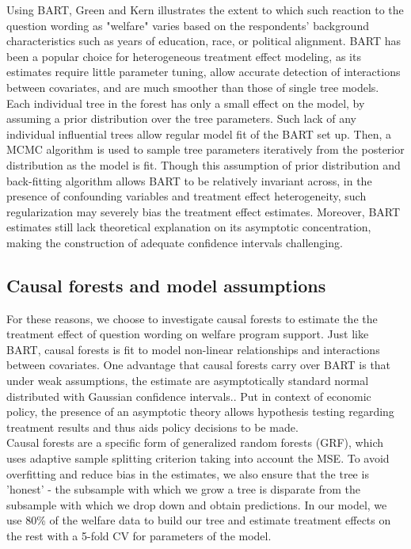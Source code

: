 \documentclass[12pt]{article}
\begin{document}
Using BART, Green and Kern illustrates the extent to which such reaction to the question wording as "welfare" varies based on the respondents' background characteristics such as years of education, race, or political alignment. BART has been a popular choice for heterogeneous treatment effect modeling, as its estimates require little parameter tuning, allow accurate detection of interactions between covariates, and are much smoother than those of single tree models. Each individual tree in the forest has only a small effect on the model, by assuming a prior distribution over the tree parameters.\cite{Chipman2010} Such lack of any individual influential trees allow regular model fit of the BART set up. Then, a MCMC algorithm is used to sample tree parameters iteratively from the posterior distribution as the model is fit. Though this assumption of prior distribution and back-fitting algorithm allows BART to be relatively invariant across, in the presence of confounding variables and treatment effect heterogeneity, such regularization may severely bias the treatment effect estimates.\cite{CarvalhoHahnMurray} Moreover, BART estimates still lack theoretical explanation on its asymptotic concentration, making the construction of adequate confidence intervals challenging. 

\subsection{Causal forests and model assumptions} 
For these reasons, we choose to investigate causal forests to estimate the the treatment effect of question wording on welfare program support. Just like BART, causal forests is fit to model non-linear relationships and interactions between covariates. One advantage that causal forests carry over BART is that under weak assumptions, the estimate are asymptotically standard normal distributed with Gaussian confidence intervals.\cite{atheywager2019}. Put in context of economic policy, the presence of an asymptotic theory allows hypothesis testing regarding treatment results and thus aids policy decisions to be made. \\

Causal forests are a specific form of generalized random forests (GRF), which uses adaptive sample splitting criterion taking into account the MSE. To avoid overfitting and reduce bias in the estimates, we also ensure that the tree is 'honest' - the subsample with which we grow a tree is disparate from the subsample with which we drop down and obtain predictions. In our model, we use 80\% of the welfare data to build our tree and estimate treatment effects on the rest with a 5-fold CV for parameters of the model. \\ 
\end{document}
